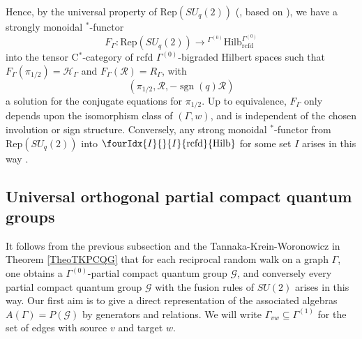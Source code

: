 \documentclass[10pt]{article}
\DeclareMathOperator{\rcf}{\mathrm{rcfd}}
\DeclareMathOperator{\sgn}{\mathrm{sgn}}
\newcommand{\Hsp}{\mathcal{H}}
\newcommand{\Hilb}{\mathrm{Hilb}}
\newcommand{\Rep}{\mathrm{Rep}}
\newcommand{\Gr}[5]{\fourIdx{#2}{#4}{#3}{#5}{#1}}%
\theoremstyle{definition}
\numberwithin{equation}{section}
\begin{document}
Hence, by the universal property of $\Rep(SU_q(2))$ (\cite[Theorem 1.4]{DCY1}, based on \cite{Tur1,EtO1,Yam1,Pin2,Pin3}), we have a strongly monoidal $^*$-functor
\begin{equation}\label{EqForget} F_{\Gamma}: \Rep(SU_q(2)) \rightarrow {}^{\Gamma^{(0)}}\Hilb_{\rcf}^{\Gamma^{(0)}}\end{equation} into the tensor C$^*$-category of rcfd $\Gamma^{(0)}$-bigraded Hilbert spaces such that $F_{\Gamma}(\pi_{1/2}) = \Hsp_{\Gamma}$ and $F_{\Gamma}(\mathscr{R}) = R_{\Gamma}$, with \[(\pi_{1/2},\mathscr{R},-\sgn(q)\mathscr{R})\] a solution for the conjugate equations for $\pi_{1/2}$. Up to equivalence, $F_{\Gamma}$ only depends upon the isomorphism class of $(\Gamma,w)$, and is independent of the chosen involution or sign structure. Conversely, any strong monoidal $^*$-functor from $\Rep(SU_q(2))$ into $\Gr{\Hilb}{I}{I}{}{\rcf}$ for some set $I$ arises in this way \cite{DCY2}.

\subsection{Universal orthogonal partial compact quantum groups}


It follows from the previous subsection and the
Tannaka-Krein-Woronowicz in Theorem \ref{TheoTKPCQG} that for each reciprocal random walk on a graph $\Gamma$, one obtains a $\Gamma^{(0)}$-partial compact quantum group $\mathscr{G}$, and conversely every partial compact quantum group $\mathscr{G}$ with the fusion rules of $SU(2)$ arises in this way. Our first aim is to give a direct representation of the associated algebras $A(\Gamma) = P(\mathscr{G})$ by generators and relations. We will write $\Gamma_{vw}\subseteq \Gamma^{(1)}$ for the set of edges with source $v$ and target $w$.
\end{document}

